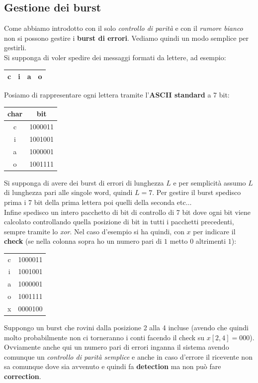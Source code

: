 \documentclass[a4paper,12pt, oneside]{book}
\begin{document}
\subsection{Gestione dei burst}
Come abbiamo introdotto con il solo \textit{controllo di parità} e con
il \textit{rumore bianco} non si possono gestire i \textbf{burst di
  errori}. Vediamo quindi un modo semplice per gestirli.\\
Si supponga di voler spedire dei messaggi formati da lettere, ad esempio:
\begin{table}[H]
  \centering
  \begin{tabular}{|c|c|c|c|}
    \hline
    c&i&a&o\\
    \hline
  \end{tabular}
\end{table}
Posiamo di rappresentare ogni lettera tramite l'\textbf{ASCII standard} a 7 bit:
\begin{table}[H]
  \centering
  \begin{tabular}{c|c}
    char & bit\\
    \hline
    c&1000011\\
    i&1001001\\
    a&1000001\\
    o&1001111
  \end{tabular}
\end{table}
Si supponga di avere dei burst di errori di lunghezza $L$ e per semplicità
assumo $L$ di lunghezza pari alle singole word, quindi $L=7$. Per gestire il
burst spedisco prima i 7 bit della prima lettera poi quelli della seconda
etc$\ldots$\\
Infine spedisco un intero pacchetto di bit di controllo di 7 bit dove ogni bit
viene calcolato controllando quella posizione di bit in tutti i pacchetti
precedenti, sempre tramite lo \textit{xor}. Nel caso d'esempio si ha quindi, con
$x$ per indicare il \textbf{check} (se nella colonna sopra ho un numero pari di
$1$ metto $0$ altrimenti $1$):
\begin{table}[H]
  \centering
  \begin{tabular}{c|c}
    c&1000011\\
    i&1001001\\
    a&1000001\\
    o&1001111\\
    \hline
    x&0000100\\
  \end{tabular}
\end{table}
Suppongo un burst che rovini dalla posizione 2 alla 4 incluse (avendo che quindi
molto probabilmente non ci torneranno i conti facendo il check su
$x[2,4]=000$).\\
Ovviamente anche qui un numero pari di errori inganna il sistema avendo comunque
un \textit{controllo di parità semplice} e anche in caso d'errore il ricevente
non sa comunque dove sia avvenuto e quindi fa \textbf{detection} ma non può fare
\textbf{correction}.
\end{document}
